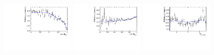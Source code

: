 \begin{figure}[h]
\includegraphics[height=!,width=0.32\textwidth]{figs/AcceptancePhspBDT/eff_cosTheta_Kpi.pdf}
\includegraphics[height=!,width=0.32\textwidth]{figs/AcceptancePhspBDT/eff_cosTheta_Dspi.pdf}
\includegraphics[height=!,width=0.32\textwidth]{figs/AcceptancePhspBDT/eff_phi_Kpi_Dspi.pdf}

\caption{}
\label{fig:}
\end{figure}
